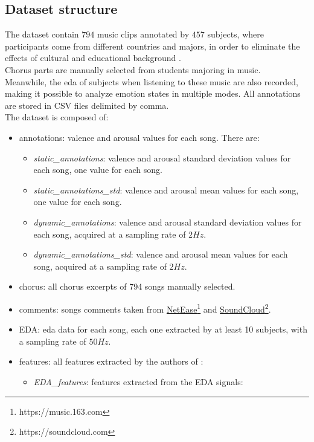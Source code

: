 \subsection{Dataset structure}
The dataset contain $794$ music clips annotated by $457$ subjects, where participants come from different countries and majors, in order to eliminate the effects of cultural and educational background \cite{hu2017cross}.
\\
Chorus parts are manually selected from students majoring in music.
\\ \indent
Meanwhile, the \gls{eda} of subjects when listening to these music are also recorded, making it possible to analyze emotion states in multiple modes. All annotations are stored in CSV files delimited by comma.
\\
The dataset is composed of:
\begin{itemize}
	\item annotations: valence and arousal values for each song. There are:
	\begin{itemize}
		\item \textit{static\_annotations}: valence and arousal standard deviation values for each song, one value for each song.
		\item \textit{static\_annotations\_std}: valence and arousal mean values for each song, one value for each song.
		\item \textit{dynamic\_annotations}: valence and arousal standard deviation values for each song, acquired at a sampling rate of $2Hz$.
		\item \textit{dynamic\_annotations\_std}: valence and arousal mean values for each song, acquired at a sampling rate of $2Hz$.
	\end{itemize}
	\item chorus: all chorus excerpts of 794 songs manually selected.
	\item comments: songs comments taken from \href{https://music.163.com}{NetEase}\footnote{https://music.163.com} and \href{https://soundcloud.com}{SoundCloud}\footnote{https://soundcloud.com}.
	\item EDA: \gls{eda} data for each song, each one extracted by at least 10 subjects, with a sampling rate of $50Hz$.
	\item features: all features extracted by the authors of \cite{zhang2018pmemo}:
	\begin{itemize}
		\item \textit{EDA\_features}: features extracted from the EDA signals:
		\begin{itemize}

\end{itemize}
\end{itemize}
\end{itemize}
